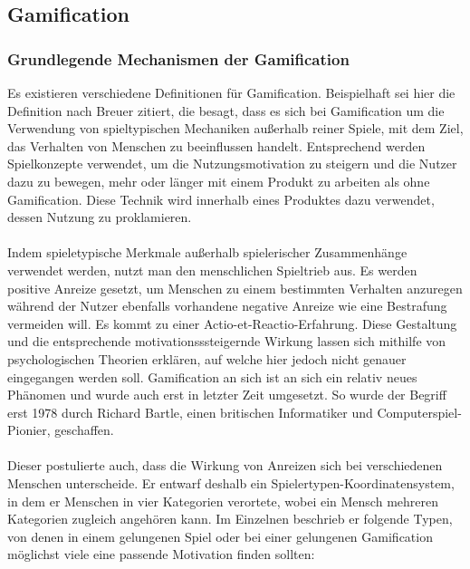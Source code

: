 \subsection{Gamification}
\subsubsection{Grundlegende Mechanismen der Gamification}
Es existieren verschiedene Definitionen für Gamification. Beispielhaft sei hier die Definition nach Breuer zitiert, die besagt, dass es sich bei Gamification um die \glqq Verwendung von spieltypischen Mechaniken außerhalb reiner Spiele, mit dem Ziel, das Verhalten von Menschen zu beeinflussen\grqq \cite{Src:GamifKochOtt} handelt. Entsprechend werden Spielkonzepte verwendet, um die Nutzungsmotivation zu steigern und die Nutzer dazu zu bewegen, mehr oder länger mit einem Produkt zu arbeiten als ohne Gamification. Diese Technik wird innerhalb eines Produktes dazu verwendet, dessen Nutzung zu proklamieren. \cite{Src:GamifKochOtt} \\ \\
Indem spieletypische Merkmale außerhalb spielerischer Zusammenhänge verwendet werden, nutzt man den menschlichen Spieltrieb aus. Es werden positive Anreize gesetzt, um Menschen zu einem bestimmten Verhalten anzuregen während der Nutzer ebenfalls vorhandene negative Anreize wie eine Bestrafung vermeiden will. \cite{Src:PlanetWissen} Es kommt zu einer \glqq Actio-et-Reactio\grqq -Erfahrung.\cite{Src:GamifKochOtt} Diese Gestaltung und die entsprechende motivationsssteigernde Wirkung lassen sich mithilfe von psychologischen Theorien erklären, auf welche hier jedoch nicht genauer eingegangen werden soll. Gamification an sich ist an sich ein relativ neues Phänomen und wurde auch erst in letzter Zeit umgesetzt. So wurde der Begriff erst 1978 durch Richard Bartle, einen britischen Informatiker und Computerspiel-Pionier, geschaffen. \cite{Src:PlanetWissen} \\ \\
Dieser postulierte auch, dass die Wirkung von Anreizen sich bei verschiedenen Menschen unterscheide. Er entwarf deshalb ein Spielertypen-Koordinatensystem, in dem er Menschen in vier Kategorien verortete, wobei ein Mensch mehreren Kategorien zugleich angehören kann.\cite{Src:Bartle} Im Einzelnen beschrieb er folgende Typen, von denen in einem gelungenen Spiel oder bei einer gelungenen Gamification möglichst viele eine passende Motivation finden sollten:
